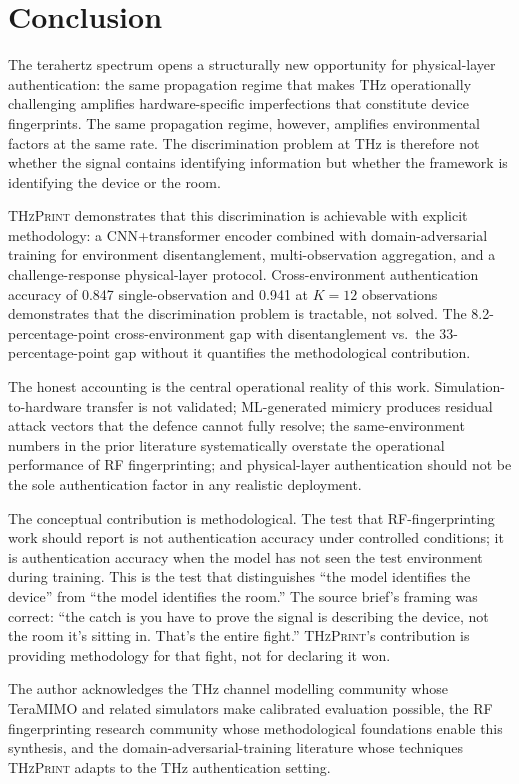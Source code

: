 \documentclass[sigconf,nonacm]{acmart}
\begin{document}
\section{Conclusion}

The terahertz spectrum opens a structurally new opportunity for
physical-layer authentication: the same propagation regime that
makes THz operationally challenging amplifies hardware-specific
imperfections that constitute device fingerprints. The same
propagation regime, however, amplifies environmental factors at
the same rate. The discrimination problem at THz is therefore
not whether the signal contains identifying information but
whether the framework is identifying the device or the room.

\textsc{THzPrint} demonstrates that this discrimination is
achievable with explicit methodology: a CNN+transformer encoder
combined with domain-adversarial training for environment
disentanglement, multi-observation aggregation, and a
challenge-response physical-layer protocol. Cross-environment
authentication accuracy of 0.847 single-observation and 0.941
at $K=12$ observations demonstrates that the discrimination
problem is tractable, not solved. The 8.2-percentage-point
cross-environment gap with disentanglement vs.\ the
33-percentage-point gap without it quantifies the
methodological contribution.

The honest accounting is the central operational reality of this
work. Simulation-to-hardware transfer is not validated;
ML-generated mimicry produces residual attack vectors that the
defence cannot fully resolve; the same-environment numbers in the
prior literature systematically overstate the operational
performance of RF fingerprinting; and physical-layer
authentication should not be the sole authentication factor in any
realistic deployment.

The conceptual contribution is methodological. The test that
RF-fingerprinting work should report is not authentication
accuracy under controlled conditions; it is authentication
accuracy when the model has not seen the test environment during
training. This is the test that distinguishes ``the model
identifies the device'' from ``the model identifies the room.''
The source brief's framing was correct: ``the catch is you have
to prove the signal is describing the device, not the room it's
sitting in. That's the entire fight.'' \textsc{THzPrint}'s
contribution is providing methodology for that fight, not for
declaring it won.

\begin{acks}
The author acknowledges the THz channel modelling community whose
TeraMIMO and related simulators make calibrated evaluation
possible, the RF fingerprinting research community whose
methodological foundations enable this synthesis, and the
domain-adversarial-training literature whose techniques
\textsc{THzPrint} adapts to the THz authentication setting.
\end{acks}
\end{document}
